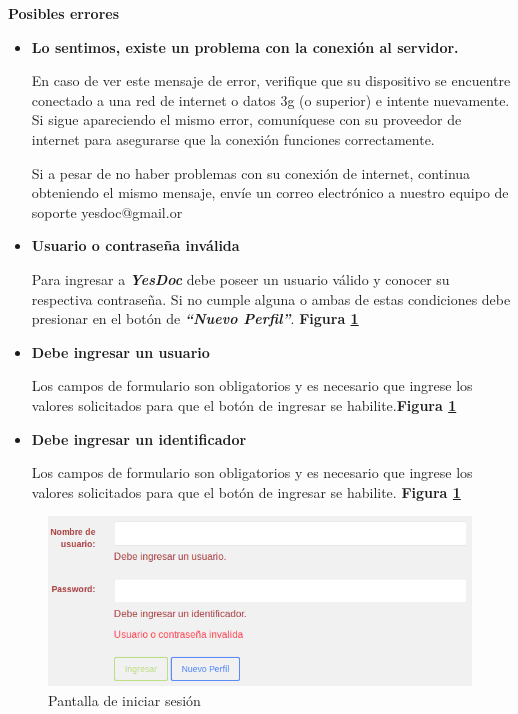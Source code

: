 \textbf{Posibles errores}
\begin{itemize}
	\item \textbf{Lo sentimos, existe un problema con la conexión al servidor.}
	
	En caso de ver este mensaje de error, verifique que su dispositivo se encuentre conectado a una red de internet o datos 3g (o superior) e intente nuevamente. Si sigue apareciendo el mismo error, comuníquese con su proveedor de internet para asegurarse que la conexión funciones correctamente.
	
	Si a pesar de no haber problemas con su conexión de internet, continua obteniendo el mismo mensaje, envíe un correo electrónico a nuestro equipo de soporte yesdoc@gmail.or
	
	\item \textbf{Usuario o contraseña inválida}
	
	Para ingresar a \textbf{\textit{YesDoc}} debe poseer un usuario válido y conocer su respectiva contraseña. Si no cumple alguna o ambas de estas condiciones debe presionar en el botón de \textbf{\textit{``Nuevo Perfil''}}. \textbf{Figura \ref{mu-us_invalido_ingresar_caracteres}}
	
	\item \textbf{Debe ingresar un usuario}
	
	Los campos de formulario son obligatorios y es necesario que ingrese los valores solicitados para que el botón de ingresar se habilite.\textbf{Figura \ref{mu-us_invalido_ingresar_caracteres}}
	\item \textbf{Debe ingresar un identificador}
	
	Los campos de formulario son obligatorios y es necesario que ingrese los valores solicitados para que el botón de ingresar se habilite.	\textbf{Figura \ref{mu-us_invalido_ingresar_caracteres}}
\end{itemize}
 \begin{figure}
 	\centering
 	\includegraphics[width=.8\textwidth]{img/manual_de_usuario/us_invalido_ingresar_caracteres}
 	\caption{Pantalla de iniciar sesión}
 	\label{mu-us_invalido_ingresar_caracteres}
 \end{figure}

